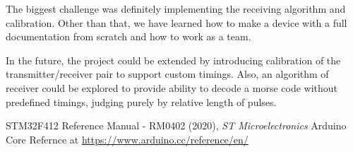 \documentclass[12pt]{article}
\begin{document}
  The biggest challenge was definitely implementing the receiving algorithm and calibration. Other than that, we have learned how to make a device 
  with a full documentation from scratch and how to work as a team.

  In the future, the project could be extended by introducing calibration of the transmitter/receiver pair
  to support custom timings. Also, an algorithm of receiver could be explored to provide
  ability to decode a morse code without predefined timings, judging purely by relative length of pulses.
	
  \newpage
	\begin{thebibliography}{9}
     STM32F412 Reference Manual - RM0402 (2020), \emph{ST Microelectronics}
     Arduino Core Refernce at \url{https://www.arduino.cc/reference/en/} 
	\end{thebibliography}
	

\end{document}
